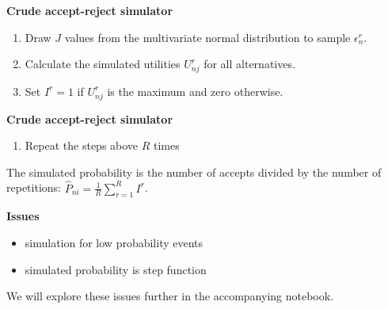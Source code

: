 \begin{frame}\textbf{Crude accept-reject simulator}\vspace{0.3cm}
\begin{enumerate}\setlength\itemsep{1em}
  \item Draw $J$ values from the multivariate normal distribution to sample $\epsilon^r_{n}$.
  \item Calculate the simulated utilities $U^r_{nj}$ for all alternatives.
  \item Set $I^r = 1$ if $U^r_{nj}$ is the maximum and zero otherwise.
\end{enumerate}
\end{frame}
\begin{frame}\textbf{Crude accept-reject simulator}\vspace{0.3cm}
\begin{enumerate}\setlength\itemsep{1em}\setcounter{enumi}{3}
  \item Repeat the steps above $R$ times\medskip
\end{enumerate}

The simulated probability is the number of accepts divided by the number of repetitions: $\hat{P}_{ni} = \frac{1}{R} \sum^R_{r=1} I^r$.

\end{frame}
\begin{frame}\textbf{Issues}\vspace{0.3cm}
\begin{itemize}\setlength\itemsep{1em}
  \item simulation for low probability events
  \item simulated probability is step function\medskip
\end{itemize}

We will explore these issues further in the accompanying notebook.

\end{frame}
